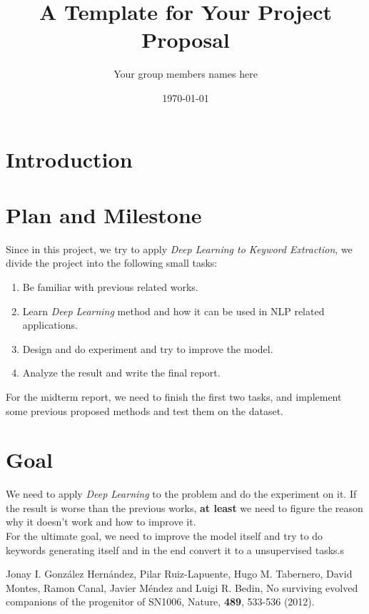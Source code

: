 \documentclass[dvips,12pt]{article}
\begin{document}

\title{A Template for Your Project Proposal}
\author{Your group members names here}
\date{\today}



\maketitle


\section{Introduction}

\section{Plan and Milestone}
Since in this project, we try to apply \emph{Deep Learning to Keyword Extraction}, we divide the project into the following small tasks:
\begin{enumerate}
    \item Be familiar with previous related works.
    \item Learn \emph{Deep Learning} method and how it can be used in NLP related applications.
    \item Design and do experiment and try to improve the model.
    \item Analyze the result and write the final report.
\end{enumerate}
For the midterm report, we need to finish the first two tasks, and implement some previous proposed methods and test them on the dataset.
\section{Goal}
We need to apply \emph{Deep Learning} to the problem and do the experiment on it. If the result is worse than the previous works, \textbf{at least} we need to figure the reason why it doesn't work and how to improve it. \\
For the ultimate goal, we need to improve the model itself and try to do keywords generating itself and in the end convert it to a unsupervised tasks.s
\begin{thebibliography}{99}

 Jonay I. Gonz\'{a}lez Hern\'{a}ndez, 
Pilar Ruiz-Lapuente,	
Hugo M. Tabernero,	
David Montes,	
Ramon Canal,	
Javier M\'{e}ndez	
and Luigi R. Bedin,
{No surviving evolved companions of the progenitor of SN1006},
Nature, {\bf 489}, 533-536 (2012).

\end{thebibliography}
\end{document}
